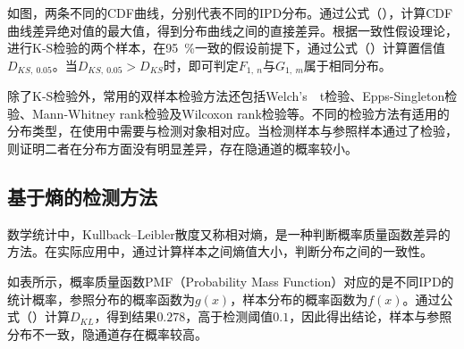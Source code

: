 如图，两条不同的CDF曲线，分别代表不同的IPD分布。通过公式（），计算CDF曲线差异绝对值的最大值，得到分布曲线之间的直接差异。根据一致性假设理论，进行K-S检验的两个样本，在{95\ \%}一致的假设前提下，通过公式（）计算置信值$D_{KS,\ 0.05}$。当$D_{KS,\ 0.05}>D_{KS}$时，即可判定$F_{1,\ n}$与$G_{1,\ m}$属于相同分布。

除了K-S检验外，常用的双样本检验方法还包括{Welch's\ \ t检验}、Epps-Singleton检验、Mann-Whitney rank检验及Wilcoxon rank检验等。不同的检验方法有适用的分布类型，在使用中需要与检测对象相对应。当检测样本与参照样本通过了检验，则证明二者在分布方面没有明显差异，存在隐通道的概率较小。

\subsection{基于熵的检测方法}
\label{chap:backinfo:detect:entropy}

数学统计中，Kullback–Leibler散度又称相对熵，是一种判断概率质量函数差异的方法。在实际应用中，通过计算样本之间熵值大小，判断分布之间的一致性。



如表所示，概率质量函数PMF（Probability Mass Function）对应的是不同IPD的统计概率，参照分布的概率函数为$g(x)$，样本分布的概率函数为$f(x)$。通过公式（）计算$D_{KL}$，得到结果$0.278$，高于检测阈值$0.1$，因此得出结论，样本与参照分布不一致，隐通道存在概率较高。


